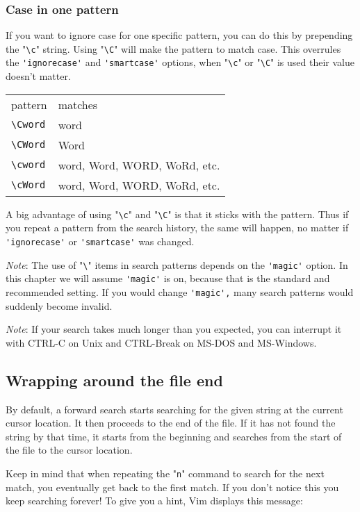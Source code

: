 \subsubsection{Case in one pattern}
If you want to ignore case for one specific pattern, you can do this by prepending the "\verb!\c!" string.
Using "\verb!\C!" will make the pattern to match case.
This overrules the \verb!'ignorecase'! and \verb!'smartcase'! options, when "\verb!\c!" or "\verb!\C!" is used their value doesn't matter.

\begin{center} \begin{tabular}{l l}
				pattern & matches \\
				\verb!\Cword! & word\\
				\verb!\CWord! & Word\\
				\verb!\cword! & word, Word, WORD, WoRd, etc.\\
				\verb!\cWord! & word, Word, WORD, WoRd, etc.\\
\end{tabular} \end{center}

A big advantage of using "\verb!\c!" and "\verb!\C!" is that it sticks with the pattern.
Thus if you repeat a pattern from the search history, the same will happen, no matter if \verb!'ignorecase'! or \verb!'smartcase'! was changed.

\emph{Note}: The use of "\verb!\!" items in search patterns depends on the \verb!'magic'! option.
In this chapter we will assume \verb!'magic'! is on, because that is the standard and recommended setting.
If you would change \verb!'magic',! many search patterns would suddenly become invalid.

\emph{Note}: If your search takes much longer than you expected, you can interrupt it with CTRL-C on Unix and  CTRL-Break on MS-DOS and MS-Windows.
\subsection{Wrapping around the file end}
By default, a forward search starts searching for the given string at the current cursor location.
It then proceeds to the end of the file.
If it has not found the string by that time, it starts from the beginning and searches from the start of the file to the cursor location.

Keep in mind that when repeating the "\verb!n!" command to search for the next match, you eventually get back to the first match.
If you don't notice this you keep searching forever!  To give you a hint, Vim displays this message:

